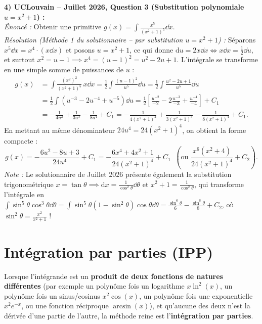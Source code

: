 \begin{exemple}
\medskip
\textbf{4) UCLouvain -- Juillet 2026, Question 3 (Substitution polynomiale $u = x^2 + 1$) :}\\
\emph{Énoncé :} Obtenir une primitive $g(x) = \displaystyle\int \frac{x^5}{(x^2 + 1)^5}\dd x$.\\
\emph{Résolution (Méthode 1 du solutionnaire -- par substitution $u = x^2 + 1$) :}
Séparons $x^5\dd x = x^4 \cdot (x\dd x)$ et posons $\boxed{u = x^2 + 1}$, ce qui donne $\mathrm{d}u = 2x\dd x \iff x\dd x = \frac{1}{2}\dd u$, et surtout $x^2 = u - 1 \implies x^4 = (u - 1)^2 = u^2 - 2u + 1$. L'intégrale se transforme en une simple somme de puissances de $u$ :
\begin{align*}
    g(x) &= \int \frac{(x^2)^2}{(x^2 + 1)^5}\,x\dd x = \frac{1}{2}\int \frac{(u - 1)^2}{u^5}\dd u = \frac{1}{2}\int \frac{u^2 - 2u + 1}{u^5}\dd u \\
    &= \frac{1}{2}\int \left(u^{-3} - 2u^{-4} + u^{-5}\right)\dd u = \frac{1}{2}\left[\frac{u^{-2}}{-2} - 2\frac{u^{-3}}{-3} + \frac{u^{-4}}{-4}\right] + C_1 \\
    &= -\frac{1}{4u^2} + \frac{1}{3u^3} - \frac{1}{8u^4} + C_1 = \boxed{-\frac{1}{4(x^2+1)^2} + \frac{1}{3(x^2+1)^3} - \frac{1}{8(x^2+1)^4} + C_1}.
\end{align*}
En mettant au même dénominateur $24u^4 = 24(x^2+1)^4$, on obtient la forme compacte :
\[
    g(x) = -\frac{6u^2 - 8u + 3}{24u^4} + C_1 = \boxed{-\frac{6x^4 + 4x^2 + 1}{24(x^2 + 1)^4} + C_1} \;\; \left(\text{ou } \boxed{\frac{x^6(x^2 + 4)}{24(x^2 + 1)^4} + C_2}\right).
\]
\emph{Note :} Le solutionnaire de Juillet 2026 présente également la substitution trigonométrique $x = \tan\theta \implies \mathrm{d}x = \frac{1}{\cos^2\theta}\dd\theta$ et $x^2+1 = \frac{1}{\cos^2\theta}$, qui transforme l'intégrale en $\int \sin^5\theta\cos^3\theta\dd\theta = \int \sin^5\theta(1-\sin^2\theta)\cos\theta\dd\theta = \frac{\sin^6\theta}{6} - \frac{\sin^8\theta}{8} + C_2$, où $\sin^2\theta = \frac{x^2}{x^2+1}$ !
\end{exemple}

\section{Intégration par parties (IPP)}

Lorsque l'intégrande est un \textbf{produit de deux fonctions de natures différentes} (par exemple un polynôme fois un logarithme $x\ln^2(x)$, un polynôme fois un sinus/cosinus $x^2\cos(x)$, un polynôme fois une exponentielle $x^2 e^{-x}$, ou une fonction réciproque $\arcsin(x)$), et qu'aucune des deux n'est la dérivée d'une partie de l'autre, la méthode reine est l'\textbf{intégration par parties}.

